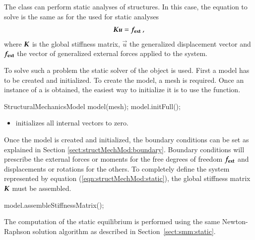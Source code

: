 The    class   can  perform  static  analyses  of
structures.  In  this case,  the  equation  to solve  is  the  same  as for  the
 used for static analyses
\begin{equation}\label{eqn:structMechMod:static}
  \boldsymbol{K} \boldsymbol{u} = \boldsymbol{f_{{\mathrm{ext}}}}~,
\end{equation}
where  $\boldsymbol{K}$ is  the  global stiffness  matrix,  $\vec{u}$ the  generalized displacement 
vector  and  $\boldsymbol{f_{{\mathrm{ext}}}}$ the  vector of generalized external  forces   applied to  the
system.


To     solve    such     a    problem     the    static     solver     of    the
  object is used.   First a
model has to be  created and initialized.  To create the model,  a mesh is required.
Once an instance of a  is obtained, the easiest way to
initialize it is  to use the 
function.

\begin{cpp}
  StructuralMechanicsModel model(mesh);
  model.initFull();
\end{cpp}


\begin{itemize}
\item {}  initializes all internal vectors to zero.
\end{itemize}


Once the model is created and  initialized, the boundary conditions can be set as
explained   in  Section   \ref{sect:structMechMod:boundary}.   Boundary   conditions  will
prescribe   the   external   forces or moments    for   the   free   degrees   of   freedom
$\boldsymbol{f_{{\mathrm{ext}}}}$ and displacements or rotations for the others.  To completely define the
system  represented  by equation  (\ref{eqn:structMechMod:static}),  the global  stiffness
matrix            $\boldsymbol{K}$             must            be            assembled.

\begin{cpp}
  model.assembleStiffnessMatrix();
\end{cpp}

The computation of the static equilibrium is performed using the same
Newton-Raphson solution algorithm as described in
Section~\ref{sect:smm:static}.


